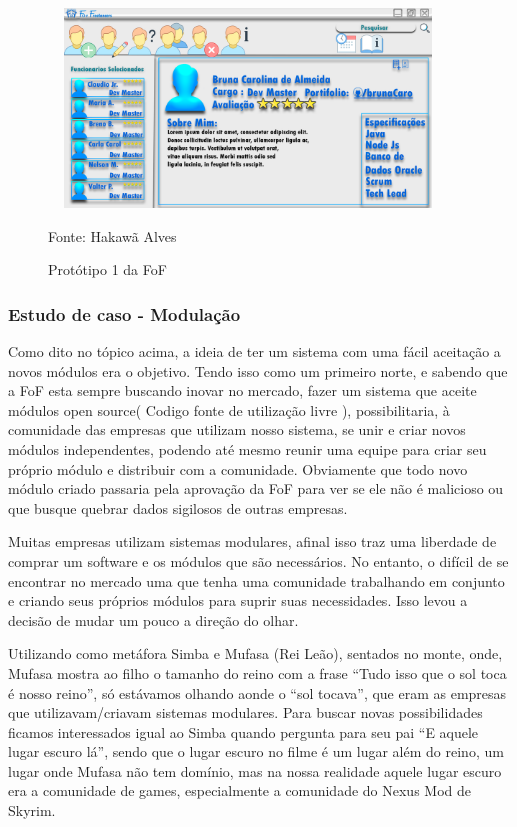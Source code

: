 \begin{figure}[!h]
	\centering
	\caption{Protótipo 1 da FoF}
	\includegraphics[width=400px, height=200px]{./images/prototipo1.png}
	\par{Fonte: Hakawã Alves}
\end{figure}

\subsubsection{Estudo de caso - Modulação}

Como dito no tópico acima, a ideia de ter um sistema com uma fácil aceitação a novos módulos era o objetivo. Tendo isso como um primeiro norte, e sabendo que a FoF esta sempre buscando inovar no mercado, fazer um sistema que aceite módulos open source( Codigo fonte de utilização livre ), possibilitaria, à comunidade das empresas que utilizam nosso sistema, se unir e criar novos módulos independentes, podendo até mesmo reunir uma equipe para criar seu próprio módulo e distribuir com a comunidade. Obviamente que todo novo módulo criado passaria pela aprovação da FoF para ver se ele não é malicioso ou que busque quebrar dados sigilosos de outras empresas.

Muitas empresas utilizam sistemas modulares, afinal isso traz uma liberdade de comprar um software e os módulos que são necessários. No entanto, o difícil de se encontrar no mercado uma que tenha uma comunidade trabalhando em conjunto e criando seus próprios módulos para suprir suas necessidades. Isso levou a decisão de mudar um pouco a direção do olhar.

Utilizando como metáfora Simba e Mufasa (\citeyearpar{rei-leao}Rei Leão), sentados no monte, onde, Mufasa mostra ao filho o tamanho do reino com a frase “Tudo isso que o sol toca é nosso reino”, só estávamos olhando
aonde o “sol tocava”, que eram as empresas que utilizavam/criavam sistemas modulares. Para buscar   
novas possibilidades ficamos interessados igual ao Simba quando pergunta para seu pai “E aquele lugar escuro lá”, sendo que o lugar escuro no filme é um lugar além do reino, um lugar onde Mufasa não tem domínio, mas na nossa realidade aquele lugar escuro era a comunidade de games, especialmente a comunidade do Nexus Mod de Skyrim.

